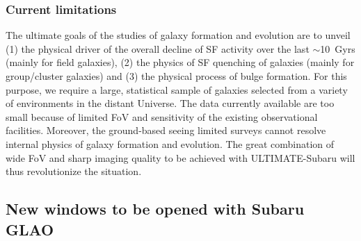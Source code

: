 \subsubsection{Current limitations}

The ultimate goals of the studies of galaxy formation and evolution are
to unveil (1) the physical driver of the overall decline of SF
activity over the last $\sim$10~Gyrs (mainly for field galaxies), 
(2) the physics of SF quenching of galaxies (mainly for group/cluster
galaxies) and (3) the physical process of bulge formation. 
For this purpose, we require a large, statistical sample of
galaxies selected from a variety of environments in the distant Universe.
The data currently available are too small
because of limited FoV and sensitivity of the existing observational facilities.
Moreover, the ground-based seeing limited surveys
cannot resolve internal physics of galaxy formation and evolution.
The great combination of wide FoV and
sharp imaging quality to be achieved with ULTIMATE-Subaru will
thus revolutionize the situation.

\subsection{New windows to be opened with Subaru GLAO}

